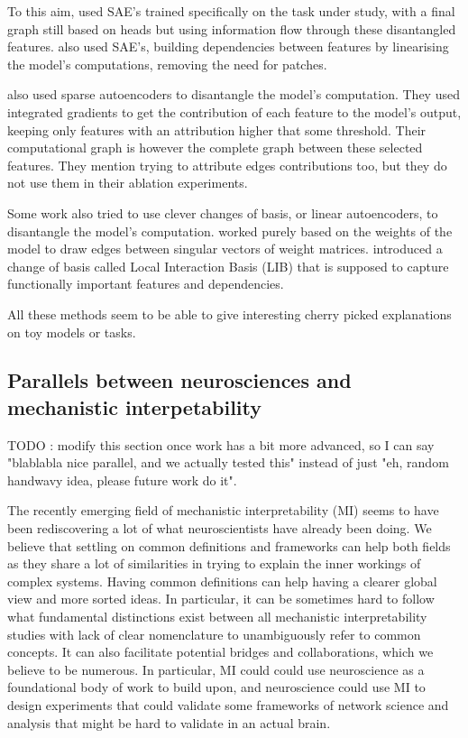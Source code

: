 \documentclass{article}
\begin{document}
To this aim, \citet{oneill2024sparse} used SAE's trained specifically on the task under study, with a final graph still based on heads but using information flow through these disantangled features. \citet{he2024dictionaryCircuits} also used SAE's, building dependencies between features by linearising the model's computations, removing the need for patches.%

\citet{marks2024sparseCircuits} also used sparse autoencoders to disantangle the model's computation. They used integrated gradients to get the contribution of each feature to the model's output, keeping only features with an attribution higher that some threshold. Their computational graph is however the complete graph between these selected features. They mention trying to attribute edges contributions too, but they do not use them in their ablation experiments.

Some work also tried to use clever changes of basis, or linear autoencoders, to disantangle the model's computation. \citet{merullo2024talking} worked purely based on the weights of the model to draw edges between singular vectors of weight matrices. \citet{bushnaq2024using} introduced a change of basis called Local Interaction Basis (LIB) that is supposed to capture functionally important features and dependencies.

All these methods seem to be able to give interesting cherry picked explanations on toy models or tasks.

\subsection{Parallels between neurosciences and mechanistic interpetability}
\label{sec:parallels}

TODO : modify this section once work has a bit more advanced, so I can say "blablabla nice parallel, and we actually tested this" instead of just "eh, random handwavy idea, please future work do it".

The recently emerging field of mechanistic interpretability (MI) seems to have been rediscovering a lot of what neuroscientists have already been doing. We believe that settling on common definitions and frameworks can help both fields as they share a lot of similarities in trying to explain the inner workings of complex systems. Having common definitions can help having a clearer global view and more sorted ideas. In particular, it can be sometimes hard to follow what fundamental distinctions exist between all mechanistic interpretability studies with lack of clear nomenclature to unambiguously refer to common concepts. It can also facilitate potential bridges and collaborations, which we believe to be numerous. In particular, MI could could use neuroscience as a foundational body of work to build upon, and neuroscience could use MI to design experiments that could validate some frameworks of network science and analysis that might be hard to validate in an actual brain.
\end{document}
